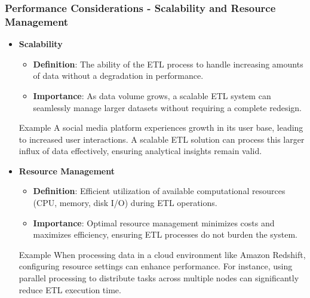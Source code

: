 \documentclass[aspectratio=169]{beamer}
\begin{document}
\begin{frame}[fragile]
    \frametitle{Performance Considerations - Scalability and Resource Management}
    \begin{itemize}
        \item \textbf{Scalability}
        \begin{itemize}
            \item \textbf{Definition}: The ability of the ETL process to handle increasing amounts of data without a degradation in performance.
            \item \textbf{Importance}: As data volume grows, a scalable ETL system can seamlessly manage larger datasets without requiring a complete redesign.
        \end{itemize}
        \begin{block}{Example}
            A social media platform experiences growth in its user base, leading to increased user interactions. A scalable ETL solution can process this larger influx of data effectively, ensuring analytical insights remain valid.
        \end{block}

        \item \textbf{Resource Management}
        \begin{itemize}
            \item \textbf{Definition}: Efficient utilization of available computational resources (CPU, memory, disk I/O) during ETL operations.
            \item \textbf{Importance}: Optimal resource management minimizes costs and maximizes efficiency, ensuring ETL processes do not burden the system.
        \end{itemize}
        \begin{block}{Example}
            When processing data in a cloud environment like Amazon Redshift, configuring resource settings can enhance performance. For instance, using parallel processing to distribute tasks across multiple nodes can significantly reduce ETL execution time.
        \end{block}
    \end{itemize}
\end{frame}
\end{document}
